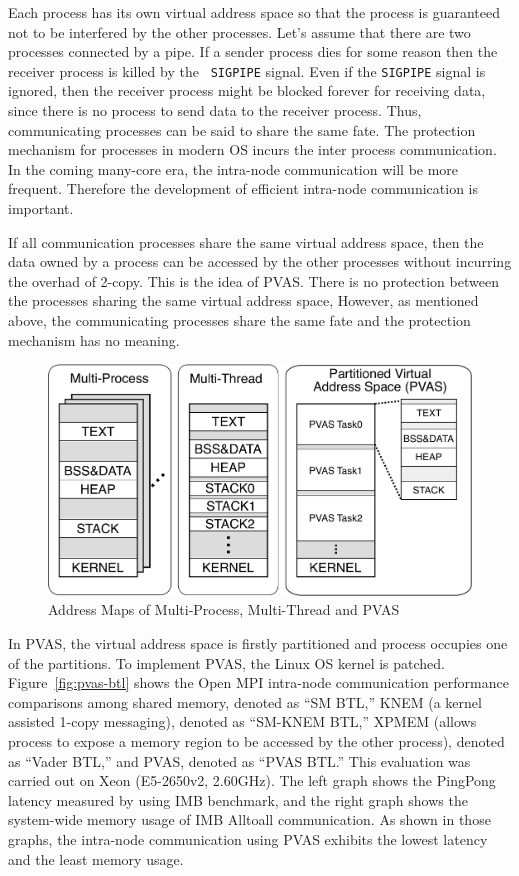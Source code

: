 Each process has its own virtual address space so that the process is
guaranteed not to be interfered by the other processes. Let's assume
that there are two processes connected by a pipe. If a sender process
dies for some reason then the receiver process is killed by the {\tt
SIGPIPE} signal.  Even if the {\tt SIGPIPE} signal is ignored, then the
receiver process might be blocked forever for receiving data, since
there is no process to send data to the receiver process. Thus,
communicating processes can be said to share the same fate. The
protection mechanism for processes in modern OS incurs the inter
process communication. In the coming many-core era, the intra-node
communication will be more frequent. Therefore the development of
efficient intra-node communication is important. 

If all communication processes share the same virtual address space,
then the data owned by a process can be accessed by the other
processes without incurring the overhad of 2-copy. This is the idea of
PVAS\cite{110009850784,Shimada:2014:ECC:2642769.2642790,SHIMADA:PGAS12,Shimada:2013:PNT:2489068.2489075,shimada-thesis}. There
is no protection between the processes sharing the same virtual
address space, However, as mentioned above, the communicating
processes share the same fate and the protection mechanism has no
meaning. 

\begin{figure}[ht]
\begin{center}
\includegraphics[width=0.8\columnwidth]{Figs/PVAS.pdf}
  \caption{Address Maps of Multi-Process, Multi-Thread and PVAS}
  \label{fig:pvas-map}
\end{center}
\end{figure}

In PVAS, the virtual address space is  
firstly partitioned and process occupies one of the partitions. To
implement PVAS, the Linux OS kernel is patched. 
Figure~\ref{fig:pvas-btl} shows the Open MPI intra-node communication
performance comparisons among shared memory, denoted as ``SM BTL,''
KNEM (a kernel assisted 1-copy messaging), denoted as ``SM-KNEM BTL,''
XPMEM (allows process to expose a memory region to be accessed by the
other process), denoted as ``Vader BTL,'' and PVAS, denoted as ``PVAS
BTL.'' This evaluation was carried out on Xeon (E5-2650v2,
2.60GHz). The left graph shows the PingPong latency measured by using
IMB benchmark, and the right graph shows the system-wide memory usage
of IMB Alltoall communication. As shown in those graphs, the
intra-node communication using PVAS exhibits the lowest latency and
the least memory usage. 

